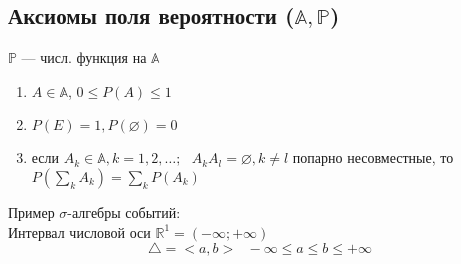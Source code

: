 \subsection{Аксиомы поля вероятности ($\mathbb{A, P}$)}
$\mathbb{P}$ --- числ. функция на $\mathbb{A}$
\begin{enumerate}
	\item $A \in \mathbb{A}$, $0 \le P(A) \le 1$
	\item $P(E) = 1, P(\varnothing) = 0$
	\item если $A_k \in \mathbb{A}, k = 1, 2, \ldots; \  \ \ A_kA_l = \varnothing, k \not= l$ попарно несовместные, то $P \left( \sum_k A_k \right) = \sum_k P \left(A_k \right)$
\end{enumerate}

Пример $\sigma$-алгебры событий: \\
Интервал числовой оси $\mathbb{R}^1 = (-\infty; + \infty)$ \\
\[\triangle = <a, b>\ \ \ -\infty \le a \le b \le +\infty\]

